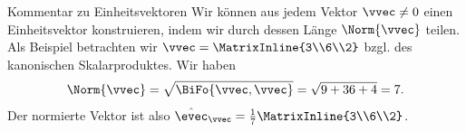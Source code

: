 \begin{Beispiel}
{Kommentar zu Einheitsvektoren}
Wir können aus jedem Vektor $\vvec\neq0$ einen Einheitsvektor konstruieren, indem wir durch dessen Länge $\Norm{\vvec}$ teilen.\\
Als Beispiel betrachten wir $\vvec=\MatrixInline{3\\6\\2}$ bzgl. des kanonischen Skalarproduktes. Wir haben
\begin{equation*}
	\Norm{\vvec}=\sqrt{\BiFo{\vvec,\vvec}}=\sqrt{9+36+4}=7.
\end{equation*}
Der normierte Vektor ist also $\hat{\evec}_\vvec=\frac{1}{7}\MatrixInline{3\\6\\2}$.
\end{Beispiel}

